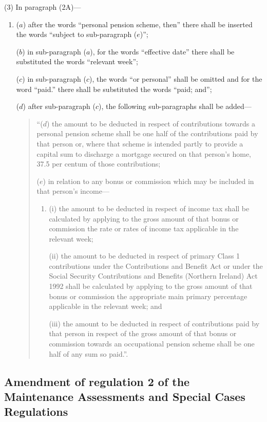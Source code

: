 \documentclass[a4paper]{article}
\begin{document}
(3) In paragraph (2A)—
\begin{enumerate}\item[]
($a$) after the words “personal pension scheme, then” there shall be inserted the words “subject to sub-paragraph ($e$)”;

($b$) in sub-paragraph ($a$), for the words “effective date” there shall be substituted the words “relevant week”;

($c$) in sub-paragraph ($c$), the words “or personal” shall be omitted and for the word “paid.” there shall be substituted the words “paid; and”;

($d$) after sub-paragraph ($c$), the following sub-paragraphs shall be added—
\begin{quotation}
“($d$) the amount to be deducted in respect of contributions towards a personal pension scheme shall be one half of the contributions paid by that person or, where that scheme is intended partly to provide a capital sum to discharge a mortgage secured on that person’s home, 37.5 per centum of those contributions;

($e$) in relation to any bonus or commission which may be included in that person’s income—
\begin{enumerate}\item[]
(i) the amount to be deducted in respect of income tax shall be calculated by applying to the gross amount of that bonus or commission the rate or rates of income tax applicable in the relevant week;

(ii) the amount to be deducted in respect of primary Class 1 contributions under the Contributions and Benefit Act or under the Social Security Contributions and Benefits (Northern Ireland) Act 1992 shall be calculated by applying to the gross amount of that bonus or commission the appropriate main primary percentage applicable in the relevant week; and

(iii) the amount to be deducted in respect of contributions paid by that person in respect of the gross amount of that bonus or commission towards an occupational pension scheme shall be one half of any sum so paid.”.
\end{enumerate}
\end{quotation}
\end{enumerate}

\subsection[42. Amendment of regulation 2 of the Maintenance Assessments and Special Cases Regulations]{Amendment of regulation 2 of the Maintenance Assessments and Special Cases Regulations}
\end{document}

